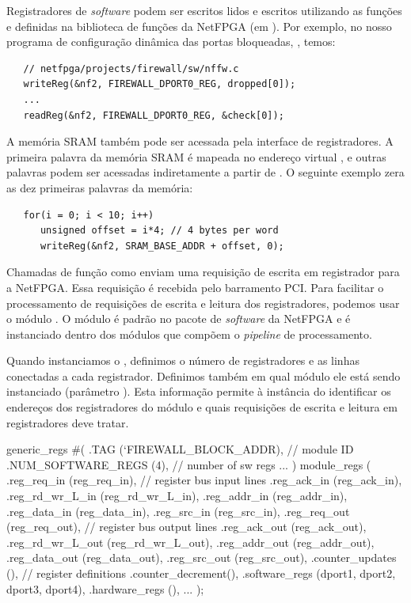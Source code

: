 Registradores de \emph{software} podem ser escritos lidos e escritos
utilizando as funções  e  definidas na
biblioteca de funções da NetFPGA (em ).  Por exemplo,
no nosso programa de configuração dinâmica das portas bloqueadas,
, temos:

\begin{verbatim}
   // netfpga/projects/firewall/sw/nffw.c
   writeReg(&nf2, FIREWALL_DPORT0_REG, dropped[0]);
   ...
   readReg(&nf2, FIREWALL_DPORT0_REG, &check[0]);
\end{verbatim}

A memória SRAM também pode ser acessada pela interface de registradores.
A primeira palavra da memória SRAM é mapeada no endereço virtual
, e outras palavras podem ser acessadas
indiretamente a partir de .  O seguinte exemplo
zera as dez primeiras palavras da memória:

\begin{verbatim}
   for(i = 0; i < 10; i++)
      unsigned offset = i*4; // 4 bytes per word
      writeReg(&nf2, SRAM_BASE_ADDR + offset, 0);
\end{verbatim}

Chamadas de função como  enviam uma requisição de escrita
em registrador para a NetFPGA.  Essa requisição é recebida pelo
barramento PCI.  Para facilitar o processamento de requisições de
escrita e leitura dos registradores, podemos usar o módulo
.  O módulo  é padrão no pacote de
\emph{software} da NetFPGA e é instanciado dentro dos módulos que
compõem o \emph{pipeline} de processamento.

Quando instanciamos o , definimos o número de
registradores e as linhas conectadas a cada registrador.  Definimos
também em qual módulo ele está sendo instanciado (parâmetro ).
Esta informação permite à instância do  identificar
os endereços dos registradores do módulo e quais requisições de escrita
e leitura em registradores deve tratar.

\begin{verilogcode}
   generic_regs
   #(
      .TAG               (`FIREWALL_BLOCK_ADDR), // module ID
      .NUM_SOFTWARE_REGS (4),                    // number of sw regs
      ...
   ) module_regs (
      .reg_req_in       (reg_req_in),      // register bus input lines
      .reg_ack_in       (reg_ack_in),
      .reg_rd_wr_L_in   (reg_rd_wr_L_in),
      .reg_addr_in      (reg_addr_in),
      .reg_data_in      (reg_data_in),
      .reg_src_in       (reg_src_in),
      .reg_req_out      (reg_req_out),     // register bus output lines
      .reg_ack_out      (reg_ack_out),
      .reg_rd_wr_L_out  (reg_rd_wr_L_out),
      .reg_addr_out     (reg_addr_out),
      .reg_data_out     (reg_data_out),
      .reg_src_out      (reg_src_out),
      .counter_updates  (),                // register definitions
      .counter_decrement(),
      .software_regs    ({dport1, dport2, dport3, dport4}),
      .hardware_regs    (),
      ...
    );
\end{verilogcode}

